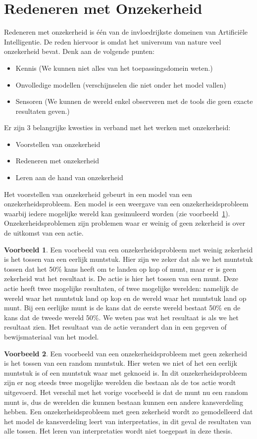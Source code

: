 \documentclass[12pt,a4paper,oneside]{book}
\theoremstyle{definition}
\newtheorem{exmp}{Voorbeeld}[section]
\begin{document}
\section{Redeneren met Onzekerheid}
Redeneren met onzekerheid is \'{e}\'{e}n van de invloedrijkste domeinen van Artifici\"{e}le Intelligentie. De reden hiervoor is omdat het universum van nature veel onzekerheid bevat. Denk aan de volgende punten:
\begin{itemize}
	\item Kennis (We kunnen niet alles van het toepassingsdomein weten.)
	\item Onvolledige modellen (verschijnselen die niet onder het model vallen)
	\item Sensoren (We kunnen de wereld enkel observeren met de tools die geen exacte resultaten geven.)
\end{itemize}
Er zijn 3 belangrijke kwesties in verband met het werken met onzekerheid:
\begin{itemize}
	\item Voorstellen van onzekerheid
	\item Redeneren met onzekerheid
	\item Leren aan de hand van onzekerheid
\end{itemize}
Het voorstellen van onzekerheid gebeurt in een model van een onzekerheidsprobleem. Een model is een weergave van een onzekerheidsprobleem waarbij iedere mogelijke wereld kan gesimuleerd worden (zie voorbeeld~\ref{exmp:faircoin}). Onzekerheidsproblemen zijn problemen waar er weinig of geen zekerheid is over de uitkomst van een actie.
\begin{exmp}
\label{exmp:faircoin}
Een voorbeeld van een onzekerheidsprobleem met weinig zekerheid is het tossen van een eerlijk muntstuk. Hier zijn we zeker dat als we het muntstuk tossen dat het 50\% kans heeft om te landen op kop of munt, maar er is geen zekerheid wat het resultaat is. De actie is hier het tossen van een munt. Deze actie heeft twee mogelijke resultaten, of twee mogelijke werelden: namelijk de wereld waar het muntstuk land op kop en de wereld waar het muntstuk land op munt. Bij een eerlijke munt is de kans dat de eerste wereld bestaat 50\% en de kans dat de tweede wereld 50\%. We weten pas wat het resultaat is als we het resultaat zien. Het resultaat van de actie verandert dan in een gegeven of bewijsmateriaal van het model.
\end{exmp}
\begin{exmp}
Een voorbeeld van een onzekerheidsprobleem met geen zekerheid is het tossen van een random muntstuk. Hier weten we niet of het een eerlijk muntstuk is of een muntstuk waar met geknoeid is. In dit onzekerheidsprobleem zijn er nog steeds twee mogelijke werelden die bestaan als de tos actie wordt uitgevoerd. Het verschil met het vorige voorbeeld is dat de munt nu een random munt is, dus de werelden die kunnen bestaan kunnen een andere kansverdeling hebben. Een onzekerheidsprobleem met geen zekerheid wordt zo gemodelleerd dat het model de kansverdeling leert van interpretaties, in dit geval de resultaten van alle tossen. Het leren van interpretaties wordt niet toegepast in deze thesis.
\end{exmp}
\end{document}
